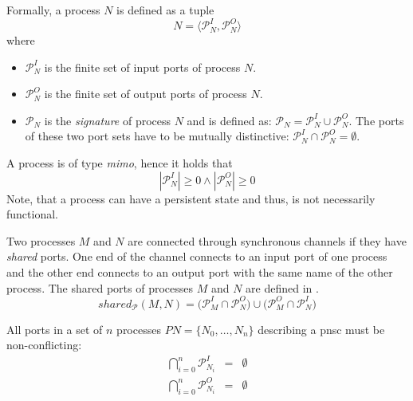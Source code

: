 \begin{definition}
    \label{def_proc}
    Formally, a process $N$ is defined as a tuple
    \begin{displaymath}
        N = \langle \mathcal{P}_N^I, \mathcal{P}_N^O \rangle
    \end{displaymath}
    where
    \begin{itemize}
        \item $\mathcal{P}_N^I$ is the finite set of input ports of process $N$.
        \item $\mathcal{P}_N^O$ is the finite set of output ports of process $N$.
        \item $\mathcal{P}_N$ is the \emph{signature} of process $N$ and is defined as: $\mathcal{P}_N = \mathcal{P}_N^I \cup \mathcal{P}_N^O$.
            The ports of these two port sets have to be mutually distinctive: \hbox{$\mathcal{P}_N^I \cap \mathcal{P}_N^O = \emptyset$}.
    \end{itemize}
\end{definition}

A process is of type \emph{\gls{mimo}}, hence it holds that
$$|\mathcal{P}_N^I| \geq 0 \land |\mathcal{P}_N^O| \geq 0$$
Note, that a process can have a persistent state and thus, is not necessarily functional.

Two processes $M$ and $N$ are connected through synchronous channels if they have \emph{shared} ports.
One end of the channel connects to an input port of one process and the other end connects to an output port with the same name of the other process.
The shared ports of processes $M$ and $N$ are defined in \Equ{\ref{eq_shared_ports}}.
\begin{equation}
    \label{eq_shared_ports}
    shared_{\mathcal{P}}(M, N) = \big ( \mathcal{P}_M^I \cap \mathcal{P}_N^O \big ) \cup \big (\mathcal{P}_M^O \cap \mathcal{P}_N^I \big )
\end{equation}

All ports in a set of $n$ processes $\mathit{PN} = \{N_0, \dots, N_n\}$ describing a \gls{pnsc} must be non-conflicting:
\begin{eqnarray}
    \label{eq_conflict_port_in}
    \bigcap_{i=0}^n \mathcal{P}_{N_i}^I &=& \emptyset \\
    \label{eq_conflict_port_out}
    \bigcap_{i=0}^n \mathcal{P}_{N_i}^O &=& \emptyset
\end{eqnarray}

